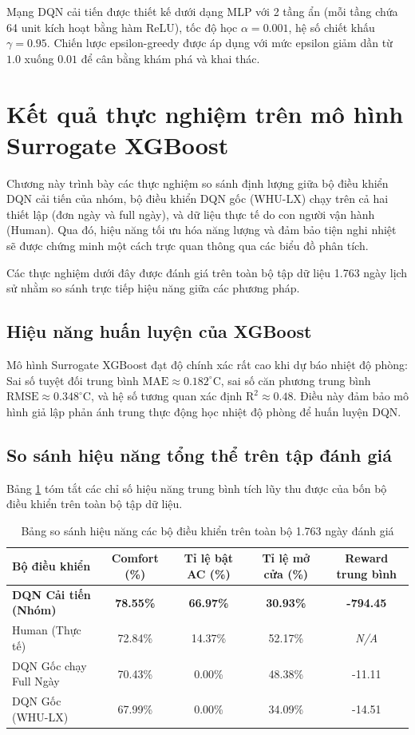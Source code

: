 \documentclass[12pt, a4paper]{article}
\begin{document}
Mạng DQN cải tiến được thiết kế dưới dạng MLP với 2 tầng ẩn (mỗi tầng chứa 64 unit kích hoạt bằng hàm ReLU), tốc độ học $\alpha = 0.001$, hệ số chiết khấu $\gamma = 0.95$. Chiến lược epsilon-greedy được áp dụng với mức epsilon giảm dần từ $1.0$ xuống $0.01$ để cân bằng khám phá và khai thác.

\section{Kết quả thực nghiệm trên mô hình Surrogate XGBoost}
Chương này trình bày các thực nghiệm so sánh định lượng giữa bộ điều khiển DQN cải tiến của nhóm, bộ điều khiển DQN gốc (WHU-LX) chạy trên cả hai thiết lập (đơn ngày và full ngày), và dữ liệu thực tế do con người vận hành (Human). Qua đó, hiệu năng tối ưu hóa năng lượng và đảm bảo tiện nghi nhiệt sẽ được chứng minh một cách trực quan thông qua các biểu đồ phân tích.

Các thực nghiệm dưới đây được đánh giá trên toàn bộ tập dữ liệu 1.763 ngày lịch sử nhằm so sánh trực tiếp hiệu năng giữa các phương pháp.

\subsection{Hiệu năng huấn luyện của XGBoost}
Mô hình Surrogate XGBoost \cite{xgboost} đạt độ chính xác rất cao khi dự báo nhiệt độ phòng: Sai số tuyệt đối trung bình $\text{MAE} \approx 0.182^\circ\text{C}$, sai số căn phương trung bình $\text{RMSE} \approx 0.348^\circ\text{C}$, và hệ số tương quan xác định $\text{R}^2 \approx 0.48$. Điều này đảm bảo mô hình giả lập phản ánh trung thực động học nhiệt độ phòng để huấn luyện DQN.

\subsection{So sánh hiệu năng tổng thể trên tập đánh giá}
Bảng \ref{tab:comparison_focused} tóm tắt các chỉ số hiệu năng trung bình tích lũy thu được của bốn bộ điều khiển trên toàn bộ tập dữ liệu.

\begin{table}[H]
    \centering
    \caption{Bảng so sánh hiệu năng các bộ điều khiển trên toàn bộ 1.763 ngày đánh giá}
    \label{tab:comparison_focused}
    \vspace{0.2cm}
    \begin{tabular}{lcccc}
        \toprule
        \textbf{Bộ điều khiển} & \textbf{Comfort (\%)} & \textbf{Tỉ lệ bật AC (\%)} & \textbf{Tỉ lệ mở cửa (\%)} & \textbf{Reward trung bình} \\
        \midrule
        \textbf{DQN Cải tiến (Nhóm)} & \textbf{78.55\%} & \textbf{66.97\%} & \textbf{30.93\%} & \textbf{-794.45} \\
        Human (Thực tế) & 72.84\% & 14.37\% & 52.17\% & \textit{N/A} \\
        DQN Gốc chạy Full Ngày & 70.43\% & 0.00\% & 48.38\% & -11.11 \\
        DQN Gốc (WHU-LX) & 67.99\% & 0.00\% & 34.09\% & -14.51 \\
        \bottomrule
    \end{tabular}
\end{table}
\end{document}
